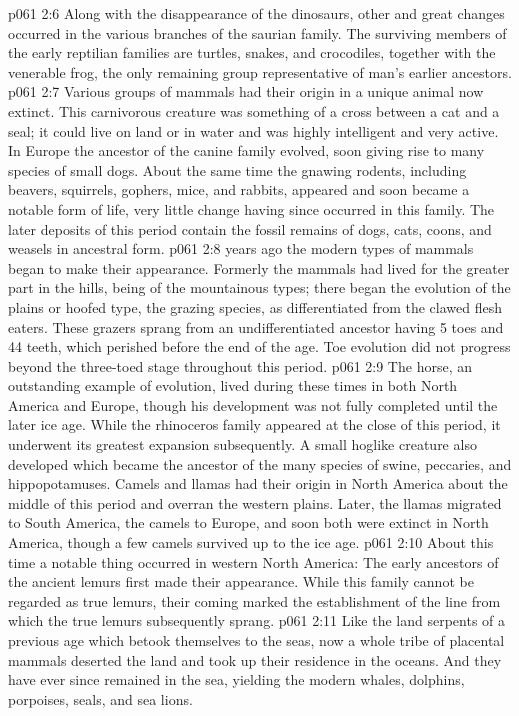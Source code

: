 \vs p061 2:6 Along with the disappearance of the dinosaurs, other and great changes occurred in the various branches of the saurian family. The surviving members of the early reptilian families are turtles, snakes, and crocodiles, together with the venerable frog, the only remaining group representative of man’s earlier ancestors.
\vs p061 2:7 Various groups of mammals had their origin in a unique animal now extinct. This carnivorous creature was something of a cross between a cat and a seal; it could live on land or in water and was highly intelligent and very active. In Europe the ancestor of the canine family evolved, soon giving rise to many species of small dogs. About the same time the gnawing rodents, including beavers, squirrels, gophers, mice, and rabbits, appeared and soon became a notable form of life, very little change having since occurred in this family. The later deposits of this period contain the fossil remains of dogs, cats, coons, and weasels in ancestral form.
\vs p061 2:8 \pc {} years ago the modern types of mammals began to make their appearance. Formerly the mammals had lived for the greater part in the hills, being of the mountainous types;  there began the evolution of the plains or hoofed type, the grazing species, as differentiated from the clawed flesh eaters. These grazers sprang from an undifferentiated ancestor having 5 toes and 44 teeth, which perished before the end of the age. Toe evolution did not progress beyond the three\hyp{}toed stage throughout this period.
\vs p061 2:9 The horse, an outstanding example of evolution, lived during these times in both North America and Europe, though his development was not fully completed until the later ice age. While the rhinoceros family appeared at the close of this period, it underwent its greatest expansion subsequently. A small hoglike creature also developed which became the ancestor of the many species of swine, peccaries, and hippopotamuses. Camels and llamas had their origin in North America about the middle of this period and overran the western plains. Later, the llamas migrated to South America, the camels to Europe, and soon both were extinct in North America, though a few camels survived up to the ice age.
\vs p061 2:10 About this time a notable thing occurred in western North America: The early ancestors of the ancient lemurs first made their appearance. While this family cannot be regarded as true lemurs, their coming marked the establishment of the line from which the true lemurs subsequently sprang.
\vs p061 2:11 Like the land serpents of a previous age which betook themselves to the seas, now a whole tribe of placental mammals deserted the land and took up their residence in the oceans. And they have ever since remained in the sea, yielding the modern whales, dolphins, porpoises, seals, and sea lions.
